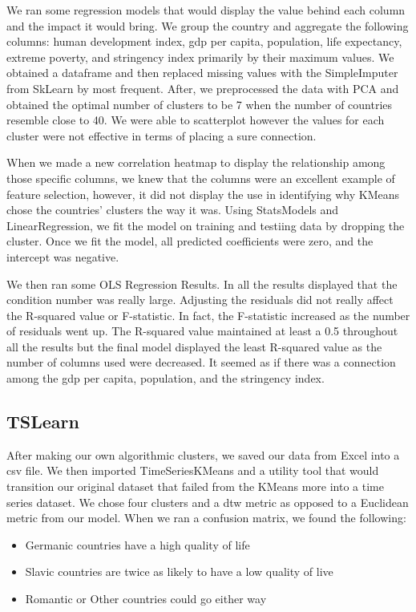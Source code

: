 \documentclass[conference]{IEEEtran}
\begin{document}
We ran some regression models that would display the value behind each column and the impact it would bring. We group the country and aggregate the following columns: human development index, gdp per capita, population, life expectancy, extreme poverty, and stringency index primarily by their maximum values. We obtained a dataframe and then replaced missing values with the SimpleImputer from SkLearn by most frequent. After, we preprocessed the data with PCA and obtained the optimal number of clusters to be 7 when the number of countries resemble close to 40. We were able to scatterplot however the values for each cluster were not effective in terms of placing a sure connection. 

When we made a new correlation heatmap to display the relationship among those specific columns, we knew that the columns were an excellent example of feature selection, however, it did not display the use in identifying why KMeans chose the countries' clusters the way it was. Using StatsModels and LinearRegression, we fit the model on training and testiing data by dropping the cluster. Once we fit the model, all predicted coefficients were zero, and the intercept was negative. 

We then ran some OLS Regression Results. In all the results displayed that the condition number was really large. Adjusting the residuals did not really affect the R-squared value or F-statistic. In fact, the F-statistic increased as the number of residuals went up. The R-squared value maintained at least a 0.5 throughout all the results but the final model displayed the least R-squared value as the number of columns used were decreased. It seemed as if there was a connection among the gdp per capita, population, and the stringency index. 

\subsection{TSLearn}

After making our own algorithmic clusters, we saved our data from Excel into a csv file. We then imported TimeSeriesKMeans and a utility tool that would transition our original dataset that failed from the KMeans more into a time series dataset. We chose four clusters and a dtw metric as opposed to a Euclidean metric from our model. When we ran a confusion matrix, we found the following:

\begin{itemize}
\item Germanic countries have a high quality of life
\item Slavic countries are twice as likely to have a low quality of live
\item Romantic or Other countries could go either way
\end{itemize}
\end{document}
